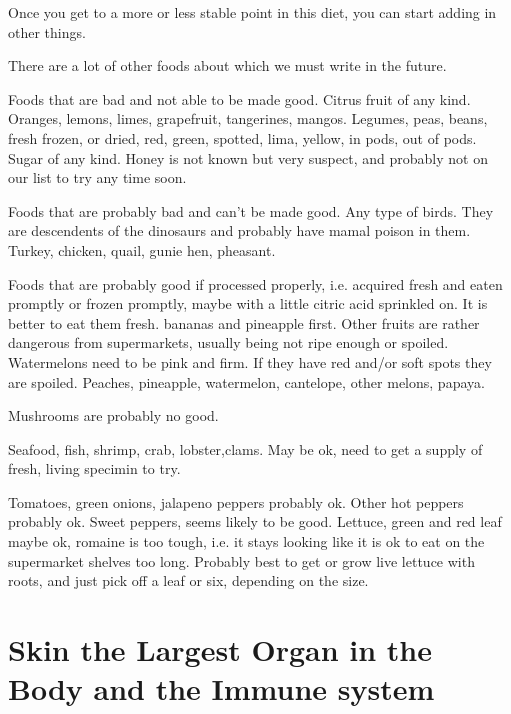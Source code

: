 \documentclass[12pt,letterpaper]{book}
\begin{document}
Once you get to a more or less stable point in this diet, you can start adding in other things. 

There are a lot of other foods about which we must write in the future.

Foods that are bad and not able to be made good. Citrus fruit of any kind. Oranges, lemons, limes, grapefruit, tangerines, mangos. Legumes, peas, beans, fresh frozen, or dried, red, green, spotted, lima, yellow, in pods, out of pods. Sugar of any kind. Honey is not known but very suspect, and probably not on our list to try any time soon.

Foods that are probably bad and can't be made good. Any type of birds. They are descendents of the dinosaurs and probably have mamal poison in them. Turkey, chicken, quail, gunie hen, pheasant.

Foods that are probably good if processed properly, i.e. acquired fresh and eaten promptly or frozen promptly, maybe with a little citric acid sprinkled on. It is better to eat them fresh. bananas and pineapple first. Other fruits are rather dangerous from supermarkets, usually being not ripe enough or spoiled. Watermelons need to be pink and firm. If they have red and/or soft spots they are spoiled. 
Peaches, pineapple, watermelon, cantelope, other melons, papaya.

Mushrooms are probably no good.

Seafood, fish, shrimp, crab, lobster,clams. May be ok, need to get a supply of fresh, living specimin to try.

Tomatoes, green onions, jalapeno peppers probably ok. Other hot peppers probably ok. Sweet peppers, seems likely to be good. Lettuce, green and red leaf maybe ok, romaine is too tough, i.e. it stays looking like it is ok to eat on the supermarket shelves too long. Probably best to get or grow live lettuce with roots, and just pick off a leaf or six, depending on the size.

\chapter{Skin the Largest Organ in the Body and the Immune system}
\end{document}

